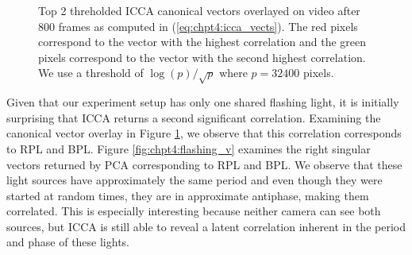 \begin{figure}
  \begin{center}
    \caption{Top 2 threholded ICCA canonical vectors overlayed on video after 800 frames
      as computed in (\ref{eq:chpt4:icca_vects}). The red pixels correspond to the vector
      with the highest correlation and the green pixels correspond to the vector with the
      second highest correlation. We use a threshold of $\log(p)/\sqrt{p}$ where $p=32400$
      pixels.}
    \label{fig:chpt4:flashing_icca}
  \end{center}
\end{figure}


Given that our experiment setup has only one shared flashing light, it is initially
surprising that ICCA returns a second significant correlation. Examining the canonical
vector overlay in Figure \ref{fig:chpt4:flashing_icca}, we observe that this correlation
corresponds to RPL and BPL. Figure \ref{fig:chpt4:flashing_v} examines the right singular
vectors returned by PCA corresponding to RPL and BPL. We observe that these light sources
have approximately the same period and even though they were started at random times, they
are in approximate antiphase, making them correlated. This is especially interesting
because neither camera can see both sources, but ICCA is still able to reveal a latent
correlation inherent in the period and phase of these lights.

